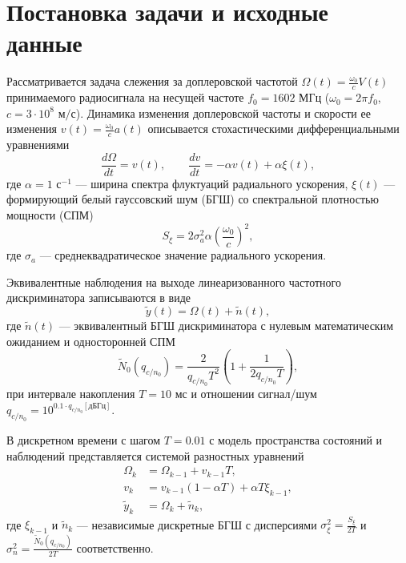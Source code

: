 \section{Постановка задачи и исходные данные}
Рассматривается задача слежения за доплеровской частотой $\Omega(t) = \frac{\omega_0}{c} V(t)$ принимаемого радиосигнала на несущей частоте $f_0 = 1602\text{ МГц}$ ($\omega_0 = 2\pi f_0$, $c = 3 \cdot 10^8\text{ м/с}$). Динамика изменения доплеровской частоты и скорости ее изменения $v(t) = \frac{\omega_0}{c} a(t)$ описывается стохастическими дифференциальными уравнениями
\begin{equation}
\frac{d\Omega}{dt} = v(t), \qquad \frac{dv}{dt} = -\alpha v(t) + \alpha \xi(t),
\end{equation}
где $\alpha = 1\text{ с}^{-1}$ --- ширина спектра флуктуаций радиального ускорения, $\xi(t)$ --- формирующий белый гауссовский шум (БГШ) со спектральной плотностью мощности (СПМ)
\begin{equation}
S_\xi = 2 \sigma_a^2 \alpha \left(\frac{\omega_0}{c}\right)^2,
\end{equation}
где $\sigma_a$ --- среднеквадратическое значение радиального ускорения.

Эквивалентные наблюдения на выходе линеаризованного частотного дискриминатора записываются в виде
\begin{equation}
\tilde{y}(t) = \Omega(t) + \tilde{n}(t),
\end{equation}
где $\tilde{n}(t)$ --- эквивалентный БГШ дискриминатора с нулевым математическим ожиданием и односторонней СПМ
\begin{equation}
\tilde{N}_0(q_{c/n_0}) = \frac{2}{q_{c/n_0} T^2} \left(1 + \frac{1}{2 q_{c/n_0} T}\right),
\end{equation}
при интервале накопления $T = 10\text{ мс}$ и отношении сигнал/шум $q_{c/n_0} = 10^{0.1 \cdot q_{c/n_0}[\text{дБГц}]}$.

В дискретном времени с шагом $T = 0.01\text{ с}$ модель пространства состояний и наблюдений представляется системой разностных уравнений
\begin{align}
\Omega_k &= \Omega_{k-1} + v_{k-1} T, \\
v_k &= v_{k-1}(1 - \alpha T) + \alpha T \xi_{k-1}, \\
\tilde{y}_k &= \Omega_k + \tilde{n}_k,
\end{align}
где $\xi_{k-1}$ и $\tilde{n}_k$ --- независимые дискретные БГШ с дисперсиями $\sigma_\xi^2 = \frac{S_\xi}{2T}$ и $\sigma_n^2 = \frac{\tilde{N}_0(q_{c/n_0})}{2T}$ соответственно.
